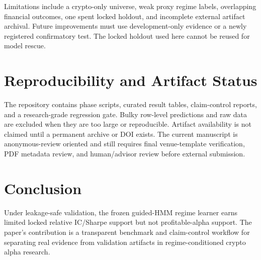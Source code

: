 \documentclass[sigconf,anonymous,review]{acmart}
\begin{document}
Limitations include a crypto-only universe, weak proxy regime labels, overlapping financial outcomes, one spent locked holdout, and incomplete external artifact archival. Future improvements must use development-only evidence or a newly registered confirmatory test. The locked holdout used here cannot be reused for model rescue.

\section{Reproducibility and Artifact Status}
The repository contains phase scripts, curated result tables, claim-control reports, and a research-grade regression gate. Bulky row-level predictions and raw data are excluded when they are too large or reproducible. Artifact availability is not claimed until a permanent archive or DOI exists. The current manuscript is anonymous-review oriented and still requires final venue-template verification, PDF metadata review, and human/advisor review before external submission.

\section{Conclusion}
Under leakage-safe validation, the frozen guided-HMM regime learner earns limited locked relative IC/Sharpe support but not profitable-alpha support. The paper's contribution is a transparent benchmark and claim-control workflow for separating real evidence from validation artifacts in regime-conditioned crypto alpha research.



\end{document}
